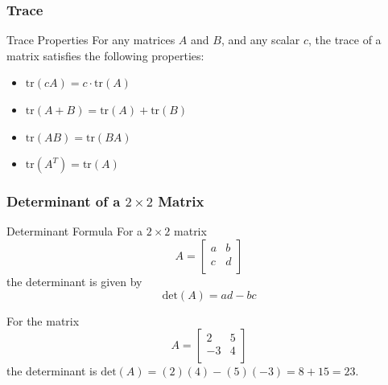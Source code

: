 \documentclass{beamer}
\begin{document}
\begin{frame}
  \frametitle{Trace }

  \begin{block}{Trace Properties}
    For any matrices \(A\) and \(B\), and any scalar \(c\), the trace of a matrix satisfies the following properties:

    \begin{itemize}
      \item \(\text{tr}(cA) = c \cdot \text{tr}(A)\)
      \item \(\text{tr}(A + B) = \text{tr}(A) + \text{tr}(B)\)
      \item \(\text{tr}(AB) = \text{tr}(BA)\) 
      \item \(\text{tr}(A^T) = \text{tr}(A)\)
    \end{itemize}
  \end{block}
\end{frame}


\begin{frame}
  \frametitle{Determinant of a \(2 \times 2\) Matrix}

  \begin{block}{Determinant Formula}
    For a \(2 \times 2\) matrix
    \[
      A = \begin{bmatrix}
        a & b \\
        c & d \\
      \end{bmatrix}
    \]
    the determinant is given by
    \[
      \text{det}(A) = ad - bc
    \]
  \end{block}

  \pause

  \begin{example}
    For the matrix
    \[
      A = \begin{bmatrix}
        2 & 5 \\
        -3 & 4 \\
      \end{bmatrix}
    \]
    the determinant is \(\text{det}(A) = (2)(4) - (5)(-3) = 8+15=23\).
  \end{example}

\end{frame}


\end{document}
